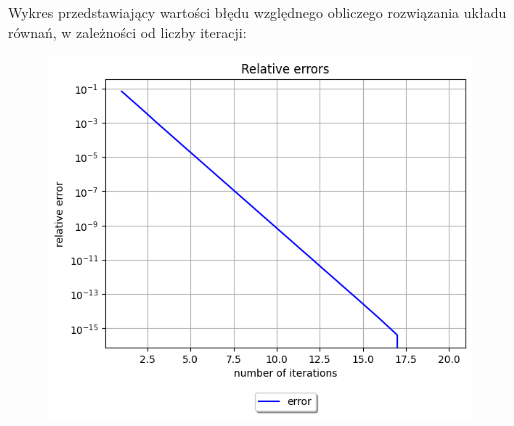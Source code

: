 \documentclass{article}
\begin{document}
Wykres przedstawiający wartości błędu względnego obliczego rozwiązania
układu równań, w zależności od liczby iteracji:
\begin{figure}[H]
  \includegraphics[width=\linewidth]{figures/multivariable.png}
\end{figure}
\end{document}
